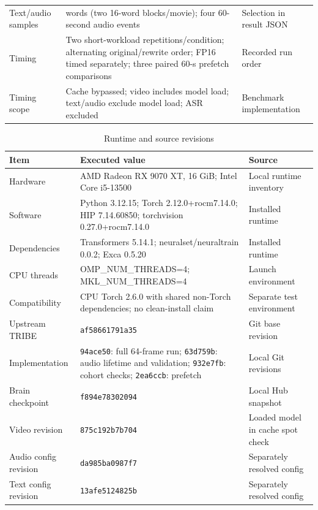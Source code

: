 \begin{table}[htbp]
\begin{tabular}{@{}>{\raggedright\arraybackslash}p{.21\linewidth}>{\raggedright\arraybackslash}p{.49\linewidth}>{\raggedright\arraybackslash}p{.24\linewidth}@{}}
Text/audio samples & 128 words (two 16-word blocks/movie); four 60-second audio events & Selection in result JSON \\
Timing & Two short-workload repetitions/condition; alternating original/rewrite order; FP16 timed separately; three paired 60-s prefetch comparisons & Recorded run order \\
Timing scope & Cache bypassed; video includes model load; text/audio exclude model load; ASR excluded & Benchmark implementation \\
\bottomrule\end{tabular}\end{table}

\begin{table}[htbp]\centering\sffamily\small
\caption{Runtime and source revisions}
\label{tab:runtime-settings}
\begin{tabular}{@{}>{\raggedright\arraybackslash}p{.21\linewidth}>{\raggedright\arraybackslash}p{.49\linewidth}>{\raggedright\arraybackslash}p{.24\linewidth}@{}}\toprule
Item & Executed value & Source \\\midrule
Hardware & AMD Radeon RX 9070 XT, 16 GiB; Intel Core i5-13500 & Local runtime inventory \\
Software & Python 3.12.15; Torch 2.12.0+rocm7.14.0; HIP 7.14.60850; torchvision 0.27.0+rocm7.14.0 & Installed runtime \\
Dependencies & Transformers 5.14.1; neuralset/neuraltrain 0.0.2; Exca 0.5.20 & Installed runtime \\
CPU threads & OMP\_NUM\_THREADS=4; MKL\_NUM\_THREADS=4 & Launch environment \\
Compatibility & CPU Torch 2.6.0 with shared non-Torch dependencies; no clean-install claim & Separate test environment \\
Upstream TRIBE & \texttt{af58661791a35} & Git base revision \\
Implementation & \texttt{94ace50}: full 64-frame run; \texttt{63d759b}: audio lifetime and validation; \texttt{932e7fb}: cohort checks; \texttt{2ea6ccb}: prefetch & Local Git revisions \\
Brain checkpoint & \texttt{f894e78302094} & Local Hub snapshot \\
Video revision & \texttt{875c192b7b704} & Loaded model in cache spot check \\
Audio config revision & \texttt{da985ba0987f7} & Separately resolved config \\
Text config revision & \texttt{13afe5124825b} & Separately resolved config \\
\bottomrule\end{tabular}\end{table}

